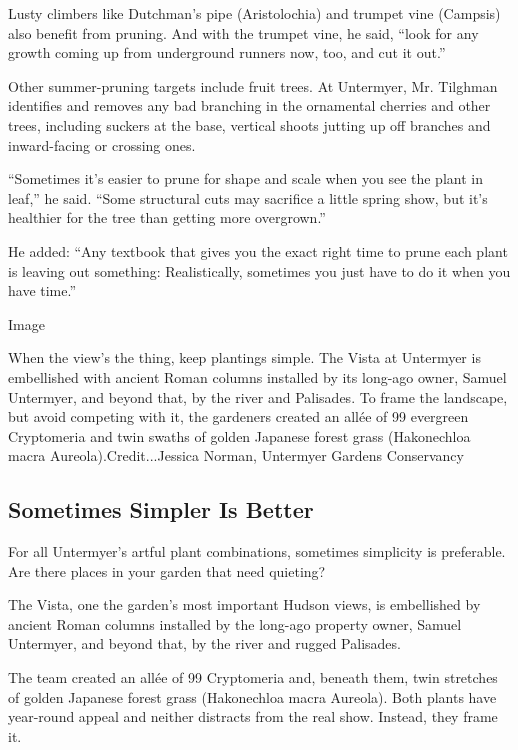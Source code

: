 Lusty climbers like Dutchman's pipe (Aristolochia) and trumpet vine
(Campsis) also benefit from pruning. And with the trumpet vine, he said,
``look for any growth coming up from underground runners now, too, and
cut it out.''

Other summer-pruning targets include fruit trees. At Untermyer, Mr.
Tilghman identifies and removes any bad branching in the ornamental
cherries and other trees, including suckers at the base, vertical shoots
jutting up off branches and inward-facing or crossing ones.

``Sometimes it's easier to prune for shape and scale when you see the
plant in leaf,'' he said. ``Some structural cuts may sacrifice a little
spring show, but it's healthier for the tree than getting more
overgrown.''

He added: ``Any textbook that gives you the exact right time to prune
each plant is leaving out something: Realistically, sometimes you just
have to do it when you have time.''

Image

When the view's the thing, keep plantings simple. The Vista at Untermyer
is embellished with ancient Roman columns installed by its long-ago
owner, Samuel Untermyer, and beyond that, by the river and Palisades. To
frame the landscape, but avoid competing with it, the gardeners created
an allée of 99 evergreen Cryptomeria and twin swaths of golden Japanese
forest grass (Hakonechloa macra Aureola).Credit...Jessica Norman,
Untermyer Gardens Conservancy

\hypertarget{sometimes-simpler-is-better}{%
\subsection{Sometimes Simpler Is
Better}\label{sometimes-simpler-is-better}}

For all Untermyer's artful plant combinations, sometimes simplicity is
preferable. Are there places in your garden that need quieting?

The Vista, one the garden's most important Hudson views, is embellished
by ancient Roman columns installed by the long-ago property owner,
Samuel Untermyer, and beyond that, by the river and rugged Palisades.

The team created an allée of 99 Cryptomeria and, beneath them, twin
stretches of golden Japanese forest grass (Hakonechloa macra Aureola).
Both plants have year-round appeal and neither distracts from the real
show. Instead, they frame it.

